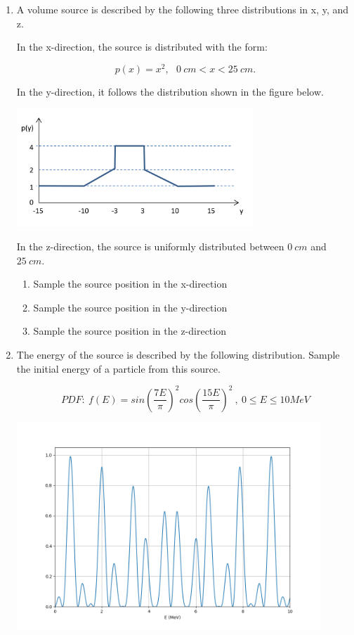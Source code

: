 \documentclass{article}
\begin{document}
\begin{enumerate}
\item A volume source is described by the following three distributions in x, y, and z.

In the x-direction, the source is distributed with the form:

  $$p(x) = x^2,\ \ \ 0\ cm < x < 25\ cm.$$


In the y-direction, it follows the distribution shown in the figure below.

  \begin{center}
      \includegraphics[width=3.5in]{piecewise-linear-y.png}
  \end{center}

In the z-direction, the source is uniformly distributed
between $0\ cm$ and $25\ cm$.

  \begin{enumerate}
  \item Sample the source position in the x-direction

  \item Sample the source position in the y-direction

  \item Sample the source position in the z-direction
  \end{enumerate}

  \newpage

\item The energy of the source is described by the following distribution.
  Sample the initial energy of a particle from this source.

  $$PDF:\ f(E) = sin(\frac{7E}{\pi})^{2}cos(\frac{15E}{\pi})^{2}\ , \ 0 \leq E \leq 10 MeV $$

  \begin{center}
      \includegraphics[width=4.5in]{energy-dist.png}
  \end{center}


\end{enumerate}
\end{document}
